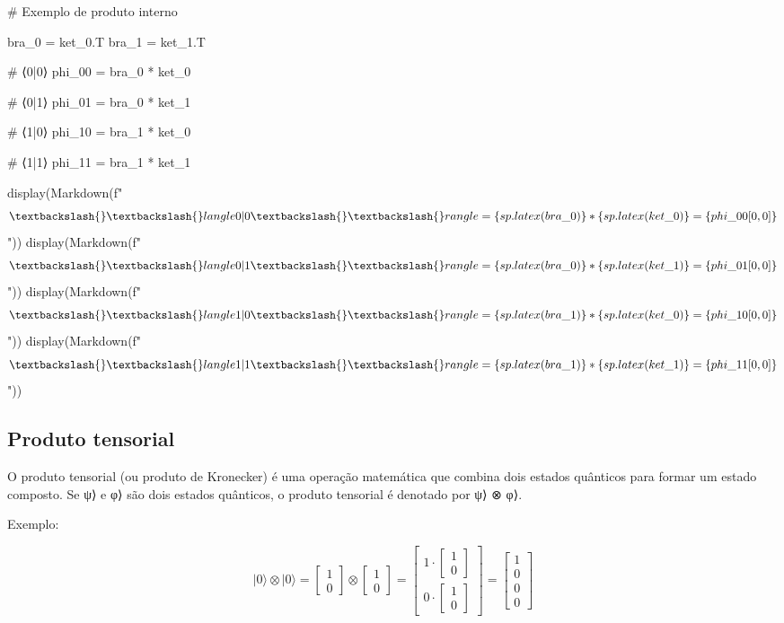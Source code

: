 \documentclass[
  brazilian,
]{report}
\newenvironment{Shaded}{\begin{snugshade}}{\end{snugshade}}
\newcommand{\NormalTok}[1]{\textcolor[rgb]{0.00,0.23,0.31}{#1}}
\begin{document}
\begin{Shaded}
\begin{Highlighting}[]

\NormalTok{\# Exemplo de produto interno}

\NormalTok{bra\_0 = ket\_0.T}
\NormalTok{bra\_1 = ket\_1.T}

\NormalTok{\# ⟨0|0⟩}
\NormalTok{phi\_00 = bra\_0 * ket\_0}

\NormalTok{\# ⟨0|1⟩}
\NormalTok{phi\_01 = bra\_0 * ket\_1}

\NormalTok{\# ⟨1|0⟩}
\NormalTok{phi\_10 = bra\_1 * ket\_0}

\NormalTok{\# ⟨1|1⟩}
\NormalTok{phi\_11 = bra\_1 * ket\_1}

\NormalTok{display(Markdown(f"$$\textbackslash{}\textbackslash{}langle 0 | 0 \textbackslash{}\textbackslash{}rangle = \{sp.latex(bra\_0)\} * \{sp.latex(ket\_0)\} = \{phi\_00[0,0]\}$$"))}
\NormalTok{display(Markdown(f"$$\textbackslash{}\textbackslash{}langle 0 | 1 \textbackslash{}\textbackslash{}rangle = \{sp.latex(bra\_0)\} * \{sp.latex(ket\_1)\} = \{phi\_01[0,0]\}$$"))}
\NormalTok{display(Markdown(f"$$\textbackslash{}\textbackslash{}langle 1 | 0 \textbackslash{}\textbackslash{}rangle = \{sp.latex(bra\_1)\} * \{sp.latex(ket\_0)\} = \{phi\_10[0,0]\}$$"))}
\NormalTok{display(Markdown(f"$$\textbackslash{}\textbackslash{}langle 1 | 1 \textbackslash{}\textbackslash{}rangle = \{sp.latex(bra\_1)\} * \{sp.latex(ket\_1)\} = \{phi\_11[0,0]\}$$"))}
\end{Highlighting}
\end{Shaded}

\subsection{Produto tensorial}\label{produto-tensorial}

O produto tensorial (ou produto de Kronecker) é uma operação matemática
que combina dois estados quânticos para formar um estado composto. Se
\textbar ψ⟩ e \textbar φ⟩ são dois estados quânticos, o produto
tensorial é denotado por \textbar ψ⟩ ⊗ \textbar φ⟩.

Exemplo:

\[|0\rangle \otimes |0\rangle = \begin{bmatrix} 1 \\ 0 \end{bmatrix} \otimes \begin{bmatrix} 1 \\ 0 \end{bmatrix} = \begin{bmatrix} 1 \cdot \begin{bmatrix} 1 \\ 0 \end{bmatrix} \\ 0 \cdot \begin{bmatrix} 1 \\ 0 \end{bmatrix} \end{bmatrix} = \begin{bmatrix} 1 \\ 0 \\ 0 \\ 0 \end{bmatrix}\]
\end{document}

